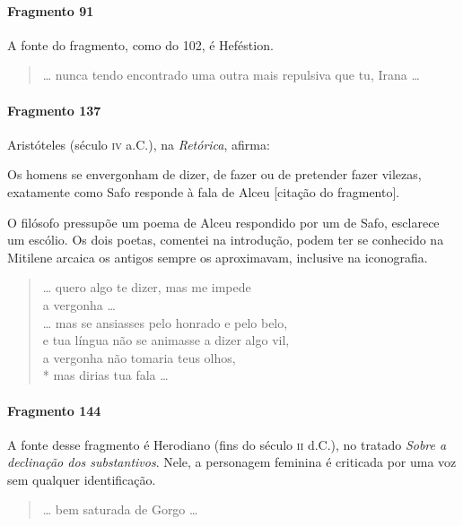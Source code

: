 \paragraph{Fragmento 91}

{\small A fonte do fragmento, como do 102, é Heféstion.}

\begin{verse}
\ldots{} nunca tendo encontrado uma outra mais repulsiva que tu, Irana \ldots{}
\end{verse}

\paragraph{Fragmento 137}

{\small Aristóteles (século \textsc{iv} a.C.), na \textit{Retórica}, afirma: 

\begin{hedraquote}
Os homens se envergonham de dizer, de fazer ou de pretender fazer vilezas, exatamente
como Safo responde à fala de Alceu [citação do fragmento].
\end{hedraquote}

O filósofo pressupõe um poema de Alceu respondido por um de Safo, esclarece um escólio. Os
dois poetas, comentei na introdução, podem ter se conhecido na Mitilene arcaica
os antigos sempre os aproximavam, inclusive na iconografia. 

\begin{verse}
\ldots{} quero algo te dizer, mas me impede\\
a vergonha \ldots{}\\
\ldots{} mas se ansiasses pelo honrado e pelo belo,\\
e tua língua não se animasse a dizer algo vil,\\
a vergonha não tomaria teus olhos,\\*
mas dirias tua fala \ldots{}
\end{verse}

\paragraph{Fragmento 144}

{\small A fonte desse fragmento é Herodiano (fins do século \textsc{ii} d.C.), no tratado
\textit{Sobre a declinação dos substantivos}. Nele, a personagem feminina é
criticada por uma voz sem qualquer identificação.}

\begin{verse}
\ldots{} bem saturada de Gorgo \ldots{}
\end{verse}

}
